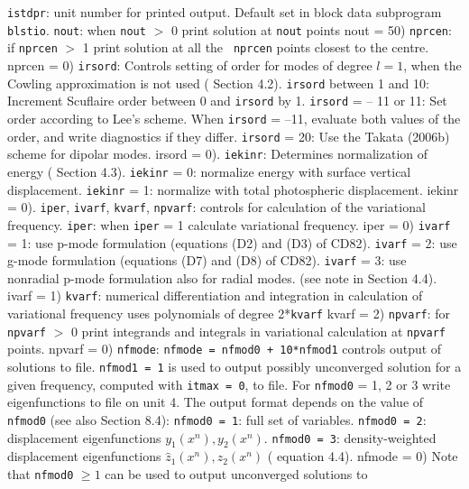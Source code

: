 \param
{\tt istdpr}: unit number for printed output. Default set in block data
subprogram {\tt blstio}.
\param
{\tt nout}: when {\tt nout} $>$ 0 print solution at {\tt nout} points
{ nout = 50})
\param
{\tt nprcen}: if {\tt nprcen} $>$ 1 print solution at all the {\tt
nprcen} points
closest to the centre.
{ nprcen = 0})
\param
{\tt irsord}: Controls setting of order for modes of degree $l = 1$,
when the Cowling approximation is not used
({\cf} Section 4.2).
\pparam
{\tt irsord} between 1 and 10:
Increment Scuflaire order between 0 and {\tt irsord} by 1.
\pparam
{\tt irsord} = -- 11 or 11: Set order according to Lee's scheme.
When {\tt irsord} = --11, evaluate both values of the order,
and write diagnostics if they differ.
\pparam
{\tt irsord} = 20: Use the Takata (2006b) scheme for dipolar modes.
{ irsord = 0}).
\param
{\tt iekinr}: Determines normalization of energy ({\cf} Section 4.3).
\pparam
{\tt iekinr} = 0: normalize energy with surface vertical displacement.
\pparam
{\tt iekinr} = 1: normalize with total photospheric displacement.
{ iekinr = 0}).
\param
{\tt iper}, {\tt ivarf}, {\tt kvarf}, {\tt npvarf}:
controls for calculation of the variational frequency.
\pparam
{\tt iper}: when {\tt iper} = 1 calculate variational frequency.
{ iper = 0})
\pparam
{\tt ivarf} = 1: use p-mode formulation (equations (D2) and (D3) of CD82).
\pparam
{\tt ivarf} = 2: use g-mode formulation (equations (D7) and (D8) of CD82).
\pparam
{\tt ivarf} = 3: use nonradial p-mode formulation also for radial modes.
(see note in Section 4.4).
{ ivarf = 1})
\pparam
{\tt kvarf}: numerical differentiation and integration in calculation
of variational frequency uses polynomials of degree 2*{\tt kvarf}
{ kvarf = 2})
\pparam
{\tt npvarf}: for {\tt npvarf} $>$ 0 print integrands and integrals in
variational calculation at {\tt npvarf} points.
{ npvarf = 0})
\param
{\tt nfmode}: {\tt nfmode = nfmod0 + 10*nfmod1} controls output of solutions
to file. {\tt nfmod1 = 1} is used to output possibly unconverged solution
for a given frequency, computed with {\tt itmax = 0}, to file.
\pparam
For {\tt nfmod0} = 1, 2 or 3 write eigenfunctions to file on unit 4.
The output format depends on the value of {\tt nfmod0}
(see also Section 8.4):
\pparam
{\tt nfmod0 = 1}: full set of variables.
\pparam
{\tt nfmod0 = 2}: displacement eigenfunctions $y_1(x^n), y_2(x^n)$.
\pparam
{\tt nfmod0 = 3}: density-weighted displacement eigenfunctions
$\hat z_1(x^n), \hat z_2(x^n)$ ({\cf} equation 4.4).
{ nfmode = 0})
\pparam
Note that {\tt nfmod0} $\ge 1$ can be used to output unconverged solutions to
